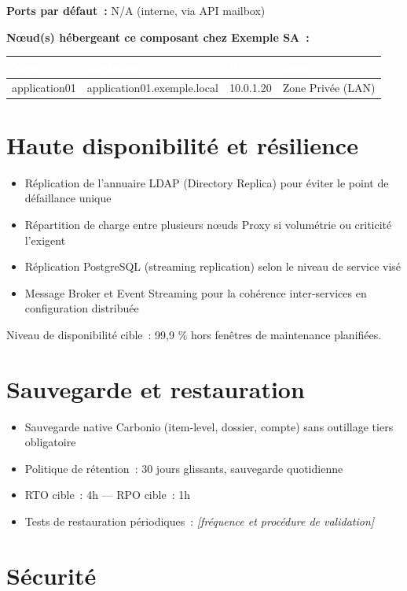\documentclass[11pt,a4paper]{report}
\newcommand{\placeholder}[1]{\textit{\textcolor{placeholdercol}{[#1]}}\par\vspace{4pt}}
\newcommand{\tblhead}[1]{\textcolor{white}{\textbf{#1}}}
\begin{document}
\textbf{Ports par défaut~:} N/A (interne, via API mailbox)

\textbf{Nœud(s) hébergeant ce composant chez Exemple SA~:}
\begin{longtable}{|p{3.2cm}|p{4.5cm}|p{3.2cm}|p{2.3cm}|}
\hline
\rowcolor{primary}\tblhead{Nœud} & \tblhead{Hostname} & \tblhead{IP} & \tblhead{Zone} \\
\hline
\endhead
application01 & application01.\allowbreak{}exemple.\allowbreak{}local & 10.\allowbreak{}0.\allowbreak{}1.\allowbreak{}20 & Zone Privée (LAN) \\
\hline
\end{longtable}


\section{Haute disponibilité et résilience}
\begin{itemize}[nosep]
  \item Réplication de l'annuaire LDAP (Directory Replica) pour éviter le point de défaillance unique
  \item Répartition de charge entre plusieurs nœuds Proxy si volumétrie ou criticité l'exigent
  \item Réplication PostgreSQL (streaming replication) selon le niveau de service visé
  \item Message Broker et Event Streaming pour la cohérence inter-services en configuration distribuée
\end{itemize}
Niveau de disponibilité cible~: 99,9 \% hors fenêtres de maintenance planifiées.

\section{Sauvegarde et restauration}
\begin{itemize}[nosep]
  \item Sauvegarde native Carbonio (item-level, dossier, compte) sans outillage tiers obligatoire
  \item Politique de rétention~: 30 jours glissants, sauvegarde quotidienne
  \item RTO cible~: 4h --- RPO cible~: 1h
  \item Tests de restauration périodiques~: \placeholder{fréquence et procédure de validation}
\end{itemize}

\section{Sécurité}
\end{document}
